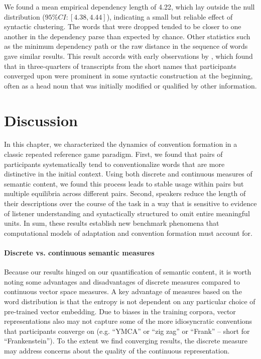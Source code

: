 \documentclass[alpha-refs]{wiley-article}
\begin{document}
We found a mean empirical dependency length of 4.22, which lay outside the null distribution ($95\% CI: [4.38, 4.44]$), indicating a small but reliable effect of syntactic clustering.
The words that were dropped tended to be closer to one another in the dependency parse than expected by chance.
Other statistics such as the minimum dependency path or the raw distance in the sequence of words gave similar results.
This result accords with early observations by \cite{Carroll80_NamingHedges}, which found that in three-quarters of transcripts from \cite{KraussWeinheimer64_ReferencePhrases} the short names that participants converged upon were prominent in some syntactic construction at the beginning, often as a head noun that was initially modified or qualified by other information. 

\section{Discussion}\label{general-discussion}

In this chapter, we characterized the dynamics of convention formation in a classic repeated reference game paradigm.
First, we found that pairs of participants systematically tend to conventionalize words that are more distinctive in the initial context.
Using both discrete and continuous measures of semantic content, we found this process leads to stable usage within pairs but multiple equilibria across different pairs.
Second, speakers reduce the length of their descriptions over the course of the task in a way that is sensitive to evidence of listener understanding and syntactically structured to omit entire meaningful units.
In sum, these results establish new benchmark phenomena that computational models of adaptation and convention formation must account for.

\paragraph{Discrete vs. continuous semantic measures}
Because our results hinged on our quantification of semantic content, it is worth noting some advantages and disadvantages of discrete measures compared to continuous vector space measures.
A key advantage of measures based on the word distribution is that the entropy is not dependent on any particular choice of pre-trained vector embedding. 
Due to biases in the training corpora, vector representations also may not capture some of the more idiosyncratic conventions that participants converge on (e.g. ``YMCA'' or ``zig zag'' or ``Frank'' -- short for ``Frankenstein'').
To the extent we find converging results, the discrete measure may address concerns about the quality of the continuous representation.
\end{document}

